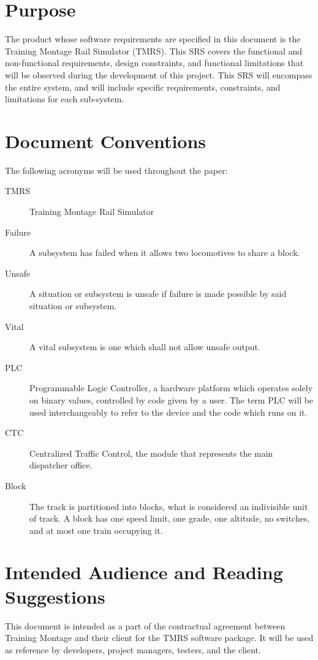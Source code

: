 \documentclass{scrreprt}
\begin{document}
\section{Purpose}
The product whose software requirements are specified in this document is the
Training Montage Rail Simulator (TMRS). This SRS covers the functional and
non-functional requirements, design constraints, and functional limitations that
will be observed during the development of this project. This SRS will encompass
the entire system, and will include specific requirements, constraints, and
limitations for each sub-system.

\section{Document Conventions}
The following acronyms will be used throughout the paper:

\begin{description}
  \item[TMRS] Training Montage Rail Simulator
  \item[Failure] A subsystem has failed when it allows two locomotives to share a block.
  \item[Unsafe] A situation or subsystem is unsafe if failure is made possible by said situation or subsystem.
  \item[Vital] A vital subsystem is one which shall not allow unsafe output.
  \item[PLC] Programmable Logic Controller, a hardware platform which operates solely on binary values, controlled by code given by a user. The term PLC will be used interchangeably to refer to the device and the code which runs on it.
  \item[CTC] Centralized Traffic Control, the module that represents the main dispatcher office.
  \item[Block] The track is partitioned into blocks, what is considered an indivisible unit of track. A block has one speed limit, one grade, one altitude, no switches, and at most one train occupying it.
\end{description}

\section{Intended Audience and Reading Suggestions}
This document is intended as a part of the contractual agreement between Training
Montage and their client for the TMRS software package. It will be used as reference
by developers, project managers, testers, and the client.
\end{document}

